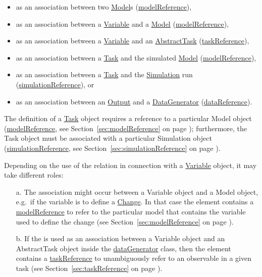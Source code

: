 \begin{itemize}
	\item{as an association between two \hyperref[class:model]{Model}s (\hyperref[sec:modelReference]{modelReference}),}
	\item{as an association between a \hyperref[class:variable]{Variable} and a \hyperref[class:model]{Model} (\hyperref[sec:modelReference]{modelReference}),}
	\item{as an association between a \hyperref[class:variable]{Variable} and an \hyperref[class:abstractTask]{AbstractTask} (\hyperref[sec:taskReference]{taskReference}),}
	\item{as an association between a \hyperref[class:task]{Task} and the simulated \hyperref[class:model]{Model} (\hyperref[sec:modelReference]{modelReference}),}
	\item{as an association between a \hyperref[class:task]{Task} and the \hyperref[class:simulation]{Simulation} run (\hyperref[sec:simulationReference]{simulationReference}), or}
	\item{as an association between an \hyperref[class:output]{Output} and a \hyperref[class:dataGenerator]{DataGenerator} (\hyperref[sec:dataReference]{dataReference}).}
\end{itemize}

The definition of a \hyperref[class:task]{Task} object requires a reference to a particular Model object (\hyperref[sec:modelReference]{modelReference}, see Section~\ref{sec:modelReference} on page \pageref{sec:modelReference}); furthermore, the Task object must be associated with a particular Simulation object (\hyperref[sec:simulationReference]{simulationReference}, see Section~\ref{sec:simulationReference} on page \pageref{sec:simulationReference}).

Depending on the use of the  relation in connection with a \hyperref[class:variable]{Variable} object, it may take different roles: 

\begin{enumerate}
\item[a.]{The  association might occur between a Variable object and a Model object, e.g.\ if the variable is to define a \hyperref[class:change]{Change}. 
In that case the  element contains a \hyperref[sec:modelReference]{modelReference} to refer to the particular model that contains the variable used to define the change (see Section~\ref{sec:modelReference} on page \pageref{sec:modelReference}). }
\item[b.]{If the  is used as an association between a Variable object and an AbstractTask object inside the \hyperref[class:dataGenerator]{dataGenerator} class, then the  element contains a \hyperref[sec:taskReference]{taskReference} to unambiguously refer to an observable in a given task (see Section~\ref{sec:taskReference} on page \pageref{sec:taskReference}).}
\end{enumerate}

